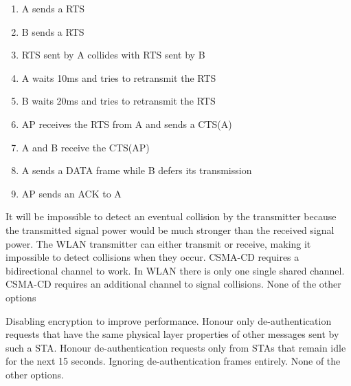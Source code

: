 \begin{questions}
    \begin{solution}
        \begin{enumerate}
            \item A sends a RTS
            \item B sends a RTS
            \item RTS sent by A collides with RTS sent by B
            \item A waits 10ms and tries to retransmit the RTS
            \item B waits 20ms and tries to retransmit the RTS
            \item AP receives the RTS from A and sends a CTS(A)
            \item A and B receive the CTS(AP)
            \item A sends a DATA frame while B defers its transmission
            \item AP sends an ACK to A
        \end{enumerate}
    \end{solution}

    \begin{checkboxes}
        \CorrectChoice It will be impossible to detect an eventual collision by the transmitter because the transmitted signal power would be much stronger than the received signal power.
        \CorrectChoice The WLAN transmitter can either transmit or receive, making it impossible to detect collisions when they occur.
        \choice CSMA-CD requires a bidirectional channel to work. In WLAN there is only one single shared channel.
        \choice CSMA-CD requires an additional channel to signal collisions.
        \choice None of the other options
    \end{checkboxes}

    \begin{checkboxes}
        \choice Disabling encryption to improve performance.
        \CorrectChoice Honour only de-authentication requests that have the same physical layer properties of other messages sent by such a STA.
        \CorrectChoice Honour de-authentication requests only from STAs that remain idle for the next 15 seconds.
        \CorrectChoice Ignoring de-authentication frames entirely.
        \choice None of the other options.
    \end{checkboxes}


\end{questions}
